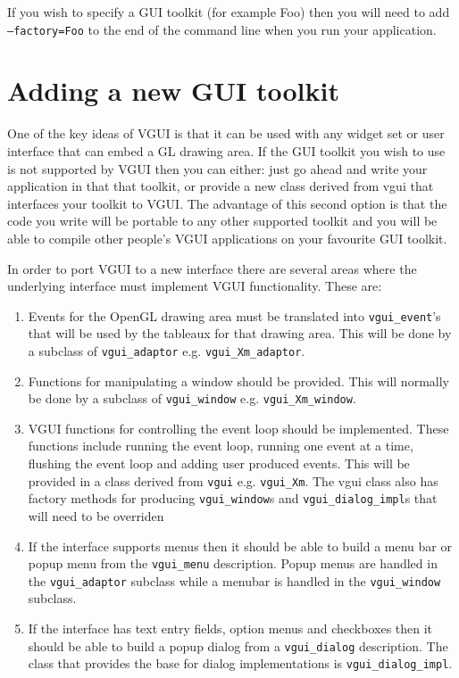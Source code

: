 \documentclass[12pt]{report} \usepackage{epsfig}
\begin{document}
If you wish to specify a GUI toolkit (for example Foo) then you will need to add
{\tt --factory=Foo} to the end of the command line when you run your application.

\section{Adding a new GUI toolkit}

One of the key ideas of VGUI is that it can be used with any widget set or
user interface that can embed a GL drawing area.  If the GUI toolkit you wish to
use is not supported by VGUI then you can either: just go ahead and write your
application in that that toolkit, or provide a new class derived from vgui that interfaces your toolkit
to VGUI.  The advantage of this second option is that the code you write will
be portable to any other supported toolkit and you will be able to compile other people's
VGUI applications on your favourite GUI toolkit.

In order to port VGUI to a new interface there are several areas where the underlying interface
must implement VGUI functionality. These are:
\begin{enumerate}
\item Events for the OpenGL drawing area must be
translated into {\tt vgui\_event}'s that will be used by the tableaux for that drawing area.
This will be done by a subclass of {\tt vgui\_adaptor} e.g. {\tt vgui\_Xm\_adaptor}.

\item Functions for manipulating a window should be provided. This will normally be done
by a subclass of {\tt vgui\_window} e.g.  {\tt vgui\_Xm\_window}.

\item VGUI functions for controlling the event loop should be implemented. These functions
include running the event loop, running one event at a time, flushing the event loop and adding
user produced events.
This will be provided in a class derived from {\tt vgui} e.g. {\tt vgui\_Xm}.
The vgui class also has factory methods for producing {\tt vgui\_window}s and
{\tt vgui\_dialog\_impl}s that will need to be overriden

\item If the interface supports menus then it should be able to build a menu bar or popup
menu from the {\tt vgui\_menu} description. Popup menus are handled in the
{\tt vgui\_adaptor} subclass while a menubar is handled in the {\tt vgui\_window} subclass.

\item If the interface has text entry fields, option menus and checkboxes  then it should be
able to build a popup dialog from a {\tt vgui\_dialog} description. The class that provides
the base for dialog implementations is {\tt vgui\_dialog\_impl}.
\end{enumerate}
\end{document}
